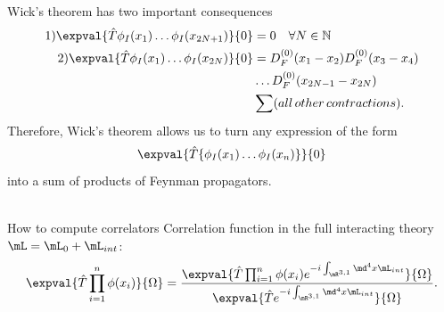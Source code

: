 Wick's theorem has two important consequences
\begin{align}
	1) \expval{\hat{T} \phi_I(x_1) \dots \phi_I(x_{2N+1})}{0} &= 0 \quad \forall N\in \mathbb{N} \\
	2) \expval{\hat{T}\phi_I(x_1) \dots \phi_I(x_{2N})}{0} &=D^{(0)}_F(x_1-x_2) D^{(0)}_F(x_3-x_4) \\\nonumber
	&\dots D^{(0)}_F(x_{2N-1}-x_{2N}) \\ \nonumber
	& \sum (all \,other\, contractions).\nonumber
\end{align}
Therefore, Wick's theorem allows us to turn any expression of the form  
\begin{equation}
	\expval{\hat{T}\{\phi_I(x_1) \dots \phi_I(x_n)\}}{0}
\end{equation}
into a sum of products of Feynman propagators.\\
\\
\begin{mybox}{How to compute correlators}
	Correlation function in the full interacting theory $\mL = \mL_0 + \mL_{int}$:
	\begin{equation}
		\expval{\hat{T}\prod_{i=1}^{n} \phi(x_i)}{\Omega} = \frac{\expval{\hat{T} \prod_{i=1}^{n} \phi(x_i) e^{-i \int_{\mR^{3,1}} \md^4 x \mL_{int}}}{\Omega}}{\expval{\hat{T}e^{-i \int_{\mR^{3,1}} \md^4 x \mL_{int}}}{\Omega}}.
	\end{equation}
\end{mybox}

